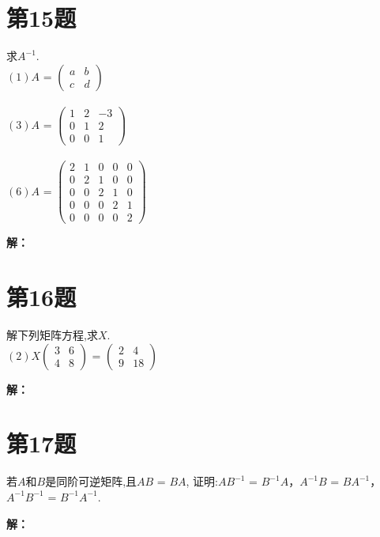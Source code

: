 \documentclass[a4paper, 12pt]{ctexart}
\begin{document}
\section{第15题}
\begin{exercise}
求$A^{-1}$.~\\

$(1)A$ = $\begin{pmatrix}
 a & b\\
 c & d
\end{pmatrix}$\\~\\

$(3)A$ = $\begin{pmatrix}
 1 & 2 & -3\\
 0 & 1 & 2\\
 0 & 0 & 1
\end{pmatrix}$\\~\\

$(6)A$ = $\begin{pmatrix}
 2 & 1 & 0 & 0 & 0\\
 0 & 2 & 1 & 0 & 0\\
 0 & 0 & 2 & 1 & 0\\
 0 & 0 & 0 & 2 & 1\\
 0 & 0 & 0 & 0 & 2
\end{pmatrix}$
\end{exercise}
\noindent\textbf{解：}


\section{第16题}
\begin{exercise}
解下列矩阵方程,求$X$.~\\

$(2)X\begin{pmatrix}
 3 & 6\\
 4 & 8
\end{pmatrix}$ = 
$\begin{pmatrix}
 2 & 4\\
 9 & 18
\end{pmatrix}$
\end{exercise}
\noindent\textbf{解：}

\section{第17题}
\begin{exercise}
若$A$和$B$是同阶可逆矩阵,且$AB$ = $BA$,
证明:$AB^{-1}$ = $B^{-1}A$，$A^{-1}B$ = $BA^{-1}$，$A^{-1}B^{-1}$ = $B^{-1}A^{-1}$.
\end{exercise}
\noindent\textbf{解：}
\end{document}
